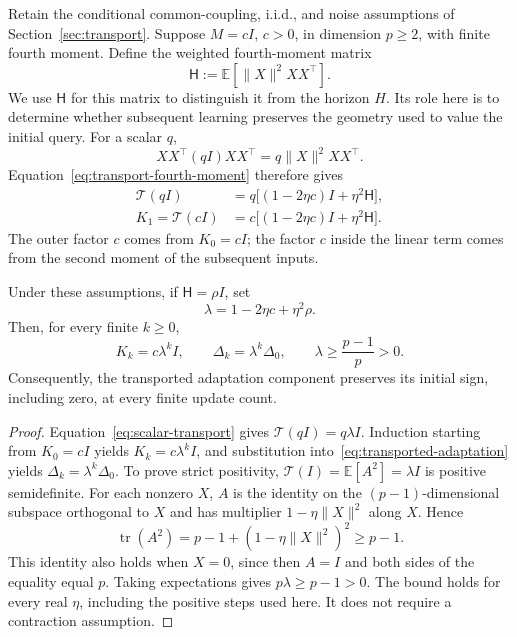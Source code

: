 Retain the conditional common-coupling, i.i.d., and noise assumptions of
Section~\ref{sec:transport}. Suppose $M=cI$, $c>0$, in dimension $p\geq2$,
with finite fourth moment. Define the weighted fourth-moment matrix
\begin{equation}
    \mathsf H:=\mathbb E[\|X\|^2XX^\top].
\end{equation}
We use $\mathsf H$ for this matrix to distinguish it from the horizon $H$.
Its role here is to determine whether subsequent learning preserves the
geometry used to value the initial query. For a scalar $q$,
\begin{equation}
    XX^\top(qI)XX^\top=q\|X\|^2XX^\top.
\end{equation}
Equation~\eqref{eq:transport-fourth-moment} therefore gives
\begin{align}
    \mathcal T(qI)&=q\bigl[(1-2\eta c)I+\eta^2\mathsf H\bigr],\\
    K_1=\mathcal T(cI)&=c\bigl[(1-2\eta c)I+\eta^2\mathsf H\bigr].
    \label{eq:scalar-transport}
\end{align}
The outer factor $c$ comes from $K_0=cI$; the factor $c$ inside the
linear term comes from the second moment of the subsequent inputs.

\begin{transportproposition}
\label{prop:temporal-persistence}
Under these assumptions, if $\mathsf H=\rho I$, set
\begin{equation}
    \lambda=1-2\eta c+\eta^2\rho.
\end{equation}
Then, for every finite $k\geq0$,
\begin{equation}
    K_k=c\lambda^kI,\qquad
    \Delta_k=\lambda^k\Delta_0,\qquad
    \lambda\geq\frac{p-1}{p}>0.
    \label{eq:temporal-persistence}
\end{equation}
Consequently, the transported adaptation component preserves its initial
sign, including zero, at every finite update count.
\end{transportproposition}

\begin{proof}
Equation~\eqref{eq:scalar-transport} gives
$\mathcal T(qI)=q\lambda I$. Induction starting from $K_0=cI$ yields
$K_k=c\lambda^kI$, and substitution
into~\eqref{eq:transported-adaptation} yields
$\Delta_k=\lambda^k\Delta_0$.
To prove strict positivity, $\mathcal T(I)=\mathbb E[A^2]=\lambda I$
is positive semidefinite. For each nonzero $X$, $A$ is the identity on
the $(p-1)$-dimensional subspace orthogonal to $X$ and has multiplier
$1-\eta\|X\|^2$ along $X$. Hence
\begin{equation}
    \operatorname{tr}(A^2)
    =p-1+(1-\eta\|X\|^2)^2\geq p-1.
\end{equation}
This identity also holds when $X=0$, since then $A=I$ and both sides
of the equality equal $p$. Taking expectations gives
$p\lambda\geq p-1>0$. The bound holds for every real $\eta$, including
the positive steps used here. It does not require a contraction assumption.
\end{proof}

